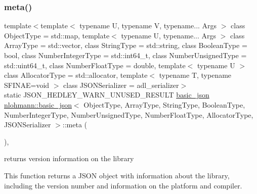 \subsubsection{\texorpdfstring{meta()}{meta()}}
{\footnotesize\ttfamily template$<$template$<$ typename U, typename V, typename... Args $>$ class Object\+Type = std\+::map, template$<$ typename U, typename... Args $>$ class Array\+Type = std\+::vector, class String\+Type  = std\+::string, class Boolean\+Type  = bool, class Number\+Integer\+Type  = std\+::int64\+\_\+t, class Number\+Unsigned\+Type  = std\+::uint64\+\_\+t, class Number\+Float\+Type  = double, template$<$ typename U $>$ class Allocator\+Type = std\+::allocator, template$<$ typename T, typename S\+F\+I\+N\+A\+E=void $>$ class J\+S\+O\+N\+Serializer = adl\+\_\+serializer$>$ \\
static J\+S\+O\+N\+\_\+\+H\+E\+D\+L\+E\+Y\+\_\+\+W\+A\+R\+N\+\_\+\+U\+N\+U\+S\+E\+D\+\_\+\+R\+E\+S\+U\+LT \mbox{\hyperlink{classnlohmann_1_1basic__json}{basic\+\_\+json}} \mbox{\hyperlink{classnlohmann_1_1basic__json}{nlohmann\+::basic\+\_\+json}}$<$ Object\+Type, Array\+Type, String\+Type, Boolean\+Type, Number\+Integer\+Type, Number\+Unsigned\+Type, Number\+Float\+Type, Allocator\+Type, J\+S\+O\+N\+Serializer $>$\+::meta (\begin{DoxyParamCaption}{ }\end{DoxyParamCaption})\hspace{0.3cm}{\ttfamily [inline]}, {\ttfamily [static]}}



returns version information on the library 

This function returns a J\+S\+ON object with information about the library, including the version number and information on the platform and compiler.


